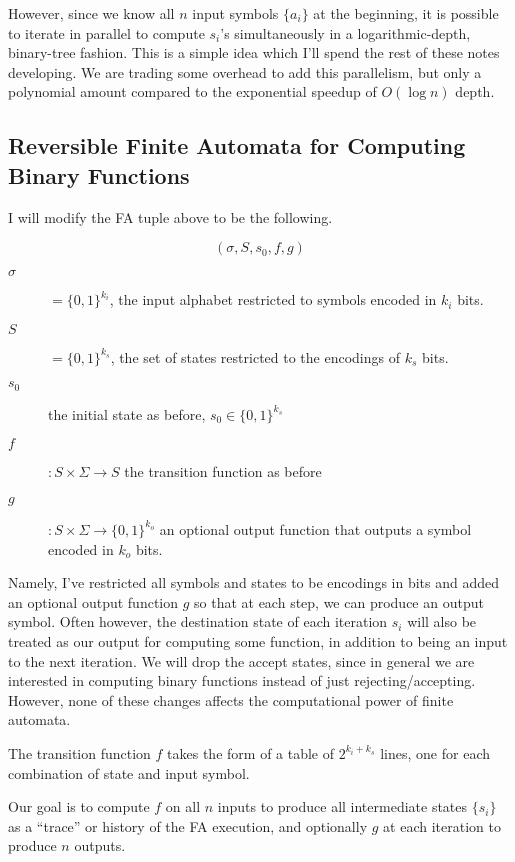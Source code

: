 However, since we know all $n$ input symbols $\{a_i\}$ at the beginning, it is
possible to iterate in parallel to compute $s_i$'s simultaneously in a
logarithmic-depth, binary-tree fashion. This is a simple idea which I'll spend
the rest of these notes developing. We are trading some overhead to add
this parallelism, but only a polynomial amount compared to the exponential
speedup of $O(\log n)$ depth.

\subsection{Reversible Finite Automata for Computing Binary Functions}

I will modify the FA tuple above to be the following.

\begin{displaymath}
(\sigma,S,s_0,f,g)
\end{displaymath}

\begin{description}
\item[$\sigma$] $= \{0,1\}^{k_i}$, the input alphabet restricted to symbols
encoded in $k_i$ bits.
\item[$S$] $= \{0,1\}^{k_s}$, the set of states restricted to the encodings of
$k_s$ bits.
\item[$s_0$] the initial state as before, $s_0 \in \{0,1\}^{k_s}$
\item[$f$] $:S \times \Sigma \rightarrow S$ the transition function as before
\item[$g$] $:S \times \Sigma \rightarrow \{0,1\}^{k_o}$ an optional output
function that outputs a symbol encoded in $k_o$ bits.
\end{description}

Namely, I've restricted all symbols and states to be encodings in bits
and added
an optional output function $g$ so that at each step, we can produce an output symbol.
Often however, the destination state of each iteration $s_i$
will also be treated as our output for computing some function, in addition to
being an input to the next iteration.
We will drop the accept states, since in general we are interested in
computing binary functions instead of just
rejecting/accepting. However, none of these changes affects the computational
power of finite automata.

The transition function $f$ takes the form of a table  of
$2^{k_i+k_s}$ lines, one for each combination of state and input symbol.

Our goal is to compute $f$ on all $n$ inputs to produce all intermediate
states $\{s_i\}$ as a ``trace'' or history of the FA execution,
and optionally $g$ at each iteration to produce $n$ outputs.

